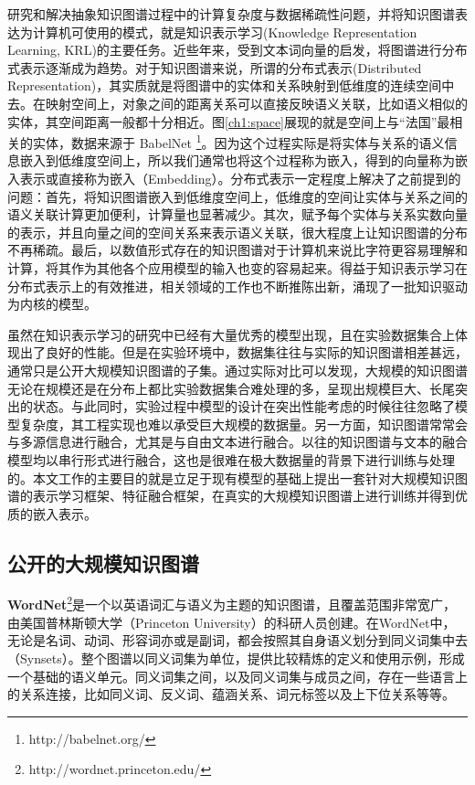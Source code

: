 研究和解决抽象知识图谱过程中的计算复杂度与数据稀疏性问题，并将知识图谱表达为计算机可使用的模式，就是知识表示学习(Knowledge Representation Learning, KRL)的主要任务。近些年来，受到文本词向量的启发，将图谱进行分布式表示逐渐成为趋势。对于知识图谱来说，所谓的分布式表示(Distributed Representation)，其实质就是将图谱中的实体和关系映射到低维度的连续空间中去。在映射空间上，对象之间的距离关系可以直接反映语义关联，比如语义相似的实体，其空间距离一般都十分相近。图\ref{ch1:space}展现的就是空间上与``法国''最相关的实体，数据来源于 BabelNet \footnote{http://babelnet.org/}。因为这个过程实际是将实体与关系的语义信息嵌入到低维度空间上，所以我们通常也将这个过程称为嵌入，得到的向量称为嵌入表示或直接称为嵌入（Embedding）。分布式表示一定程度上解决了之前提到的问题：首先，将知识图谱嵌入到低维度空间上，低维度的空间让实体与关系之间的语义关联计算更加便利，计算量也显著减少。其次，赋予每个实体与关系实数向量的表示，并且向量之间的空间关系来表示语义关联，很大程度上让知识图谱的分布不再稀疏。最后，以数值形式存在的知识图谱对于计算机来说比字符更容易理解和计算，将其作为其他各个应用模型的输入也变的容易起来。得益于知识表示学习在分布式表示上的有效推进，相关领域的工作也不断推陈出新，涌现了一批知识驱动为内核的模型。

虽然在知识表示学习的研究中已经有大量优秀的模型出现，且在实验数据集合上体现出了良好的性能。但是在实验环境中，数据集往往与实际的知识图谱相差甚远，通常只是公开大规模知识图谱的子集。通过实际对比可以发现，大规模的知识图谱无论在规模还是在分布上都比实验数据集合难处理的多，呈现出规模巨大、长尾突出的状态。与此同时，实验过程中模型的设计在突出性能考虑的时候往往忽略了模型复杂度，其工程实现也难以承受巨大规模的数据量。另一方面，知识图谱常常会与多源信息进行融合，尤其是与自由文本进行融合。以往的知识图谱与文本的融合模型均以串行形式进行融合，这也是很难在极大数据量的背景下进行训练与处理的。本文工作的主要目的就是立足于现有模型的基础上提出一套针对大规模知识图谱的表示学习框架、特征融合框架，在真实的大规模知识图谱上进行训练并得到优质的嵌入表示。

\subsection{公开的大规模知识图谱}

	\textbf{WordNet}\footnote{http://wordnet.princeton.edu/}是一个以英语词汇与语义为主题的知识图谱，且覆盖范围非常宽广，由美国普林斯顿大学（Princeton University）的科研人员创建。在WordNet中，无论是名词、动词、形容词亦或是副词，都会按照其自身语义划分到同义词集中去（Synsets）。整个图谱以同义词集为单位，提供比较精炼的定义和使用示例，形成一个基础的语义单元。同义词集之间，以及同义词集与成员之间，存在一些语言上的关系连接，比如同义词、反义词、蕴涵关系、词元标签以及上下位关系等等。

